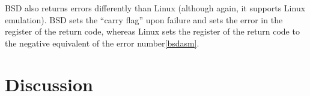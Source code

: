 \documentclass[a4paper, 10pt]{report}
\begin{document}
BSD also returns errors differently than Linux (although again, it supports
Linux emulation). BSD sets the ``carry flag'' upon failure and sets the error
in the register of the return code, whereas Linux sets the register of the
return code to the negative equivalent of the error number\ref{bsdasm}.







% 


\chapter{Discussion}

%

\end{document}
